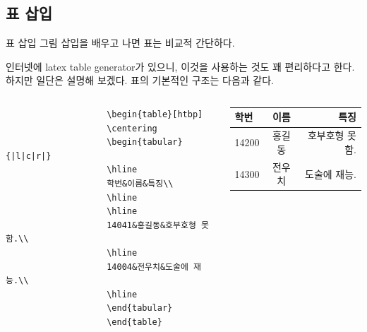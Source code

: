 \documentclass[12pt]{beamer}
\begin{document}
\subsection{표 삽입}
\begin{frame}[fragile]{표 삽입}
	그림 삽입을 배우고 나면 표는 비교적 간단하다.
	
	인터넷에 latex table generator가 있으니, 이것을 사용하는 것도 꽤 편리하다고 한다. 
	하지만 일단은 설명해 보겠다. 표의 기본적인 구조는 다음과 같다.
	\begin{columns}
		\begin{column}{.4\textwidth}
			\begin{center}
				\begin{scriptsize}
					\begin{verbatim}
					\begin{table}[htbp]
					\centering
					\begin{tabular}{|l|c|r|}
					\hline
					학번&이름&특징\\
					\hline
					\hline
					14041&홍길동&호부호형 못함.\\
					\hline
					14004&전우치&도술에 재능.\\
					\hline
					\end{tabular}
					\end{table}
					\end{verbatim}
				\end{scriptsize}
			\end{center}
		\end{column}
		\begin{column}{.5\textwidth}
			\begin{scriptsize}
				\begin{table}[htbp]
					\centering
					\begin{tabular}{|l|c|r|}
						\hline
						학번&이름&특징\\
						\hline
						\hline
						14200&홍길동&호부호형 못함.\\
						\hline
						14300&전우치&도술에 재능.\\
						\hline
					\end{tabular}
				\end{table}
			\end{scriptsize}
		\end{column}
	\end{columns}
\end{frame}
\end{document}
